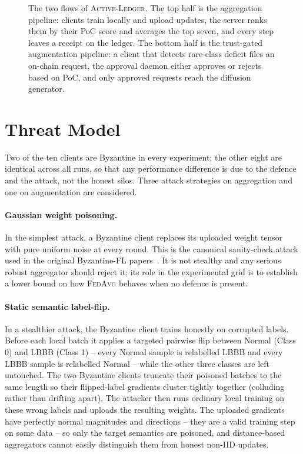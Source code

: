 \documentclass[runningheads]{llncs}
\newcommand{\fedavg}{\textsc{FedAvg}\xspace}
\newcommand{\actledger}{\textsc{Active-Ledger}\xspace}
\begin{document}
\begin{figure}[!htbp]
\centering
\resizebox{1\linewidth}{!}{%
}
\caption{The two flows of \actledger. The top half is the
aggregation pipeline: clients train locally and upload updates, the
server ranks them by their PoC score and averages the top seven, and
every step leaves a receipt on the ledger. The bottom half is the
trust-gated augmentation pipeline: a client that detects rare-class
deficit files an on-chain request, the approval daemon either
approves or rejects based on PoC, and only approved requests reach
the diffusion generator.}
\label{fig:architecture}
\end{figure}

\section{Threat Model}
\label{sec:threat}

Two of the ten clients are Byzantine in every experiment; the other
eight are identical across all runs, so that any performance
difference is due to the defence and the attack, not the honest
silos. Three attack strategies on aggregation and one on augmentation
are considered.

\paragraph{Gaussian weight poisoning.}
In the simplest attack, a Byzantine client replaces its uploaded
weight tensor with pure uniform noise at every round. This is the
canonical sanity-check attack used in the original Byzantine-FL
papers~\cite{blanchard2017krum,elmhamdi2018bulyan}. It is not
stealthy and any serious robust aggregator should reject it; its
role in the experimental grid is to establish a lower bound on how
\fedavg behaves when no defence is present.

\paragraph{Static semantic label-flip.}
In a stealthier attack, the Byzantine client trains honestly on
corrupted labels. Before each local batch it applies a targeted
pairwise flip between Normal (Class 0) and LBBB (Class 1) -- every
Normal sample is relabelled LBBB and every LBBB sample is relabelled
Normal -- while the other three classes are left untouched. The two
Byzantine clients truncate their poisoned batches to the same length
so their flipped-label gradients cluster tightly together (colluding
rather than drifting apart). The attacker then runs ordinary local
training on these wrong labels and uploads the resulting weights.
The uploaded gradients have perfectly normal magnitudes and
directions -- they are a valid training step on some data -- so only
the target semantics are poisoned, and distance-based aggregators
cannot easily distinguish them from honest non-IID updates.
\end{document}
